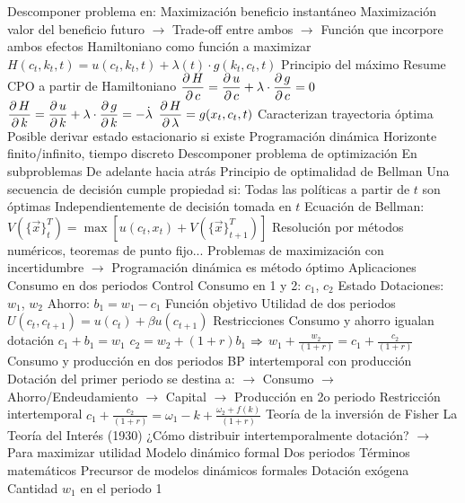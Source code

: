 \documentclass{nuevotema}
\begin{document}
\begin{esquemal}
				\4 Descomponer problema en:
				\4[] Maximización beneficio instantáneo
				\4[] Maximización valor del beneficio futuro
				\4[] $\to$ Trade-off entre ambos
				\4[] $\to$ Función que incorpore ambos efectos
				\4[$\then$] Hamiltoniano como función a maximizar
				\4[] $H(c_t,k_t,t) = u(c_t,k_t,t) + \lambda (t) \cdot g(k_t,c_t,t)$
				\4 Principio del máximo
				\4[] Resume CPO a partir de Hamiltoniano
				\4[] $\dfrac{\partial \, H}{\partial \, c} = \dfrac{\partial \, u}{\partial \, c} + \lambda \cdot \dfrac{\partial \, g}{\partial \, c}= 0$
				\4[] $\dfrac{\partial \, H}{\partial \, k} = \dfrac{\partial \, u}{\partial \, k} + \lambda \cdot \dfrac{\partial \, g}{\partial \, k} = -\dot{\lambda} $
				\4[] $\dfrac{\partial \, H}{\partial \, \lambda} = g(x_t, c_t, t)$
				\4[] Caracterizan trayectoria óptima
				\4[] Posible derivar estado estacionario si existe
			\3 Programación dinámica
				\4 Horizonte finito/infinito, tiempo discreto
				\4 Descomponer problema de optimización
				\4[] En subproblemas
				\4[] De adelante hacia atrás
				\4 Principio de optimalidad de Bellman
				\4[] Una secuencia de decisión cumple propiedad si:
				\4[] Todas las políticas a partir de $t$ son óptimas
				\4[] Independientemente de decisión tomada en $t$
				\4 Ecuación de Bellman:
				\4[] $V\left( \{ \vec{x} \}_t^T \right) = \max \left[ u(c_t,x_t) + V\left( \{\vec{x} \}_{t+1}^T \right) \right]$
				\4 Resolución por métodos numéricos, teoremas de punto fijo...
				\4 Problemas de maximización con incertidumbre
				\4[] $\to$ Programación dinámica es método óptimo
		\2 Aplicaciones
			\3 Consumo en dos periodos
				\4 {Control}
				\4[] Consumo en 1 y 2: $c_1$, $c_2$
				\4 {Estado}
				\4[] Dotaciones: $w_1$, $w_2$
				\4[] Ahorro: $b_1 = w_1 - c_1$
				\4 {Función objetivo}
				\4[] Utilidad de dos periodos
				\4[] $U(c_t, c_{t+1}) = u(c_t) + \beta u(c_{t+1})$
				\4 {Restricciones}
				\4[] Consumo y ahorro igualan dotación
				\4[] $c_1 + b_1 = w_1$
				\4[] $c_2 = w_2 + (1+r)b_1$
				\4[] $\then$ $w_1 + \frac{w_2}{(1+r)} = c_1 + \frac{c_2}{(1+r)}$
			\3 Consumo y producción en dos periodos
				\4 BP intertemporal con producción
				\4 Dotación del primer periodo se destina a:
				\4[] $\to$ Consumo
				\4[] $\to$ Ahorro/Endeudamiento
				\4[] $\to$ Capital $\to$ Producción en 2o periodo
				\4 {Restricción intertemporal}
				\4[] $c_1 + \frac{c_2}{(1+r)} = \omega_1 - k + \frac{\omega_2+f(k)}{(1+r)}$
			\3 Teoría de la inversión de Fisher
				\4 La Teoría del Interés (1930)
				\4 ¿Cómo distribuir intertemporalmente dotación?
				\4[] $\to$ Para maximizar utilidad
				\4 Modelo dinámico formal
				\4[] Dos periodos
				\4[] Términos matemáticos
				\4 Precursor de modelos dinámicos formales
				\4 Dotación exógena
				\4[] Cantidad $w_1$ en el periodo 1

\end{esquemal}
\end{document}
